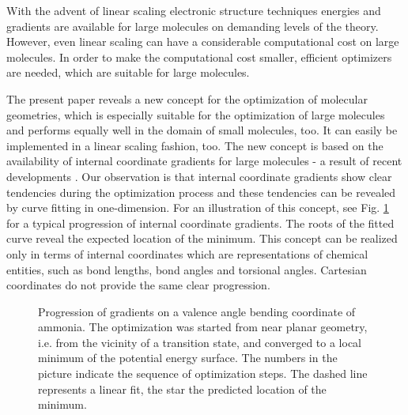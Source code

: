 \documentclass[prl,aps,twocolumn,showpacs,twocolumngrid,superbib]{revtex4}
\begin{document}
With the advent of linear scaling electronic structure techniques 
\cite{Goedecker99}
energies and gradients are available for large molecules on demanding
levels of the theory. However, even linear scaling can have 
a considerable computational cost on large molecules. In order to
make the computational cost smaller, efficient optimizers are
needed, which are suitable for large molecules.

The present paper reveals a new concept for the optimization of
molecular geometries, which is especially suitable for the
optimization of large molecules and performs equally well in the
domain of small molecules, too. It can easily be implemented
in a linear scaling fashion, too.
The new concept is based on the availability of internal coordinate
gradients for large molecules - a result of recent developments
\cite{paizs_coordtrf1,nemeth_coordtrf1,paizs_coordtrf2,nemeth_coordtrf2,billeter_coordtrf,andzelm_coordtrf,kudin_coordtrf}.
Our observation is that internal coordinate gradients show clear
tendencies during the optimization process and these tendencies 
can be revealed
by curve fitting in one-dimension. 
For an illustration of this concept,
see Fig. \ref{NH3outp6} for a typical progression of internal coordinate
gradients. The roots of the fitted curve reveal the expected location
of the minimum. This concept can be realized only in terms of
internal coordinates which are representations of chemical entities, such as
bond lengths, bond angles and torsional angles. Cartesian
coordinates do not provide the same clear progression.
\begin{figure}[h]
\caption{
\small  
Progression of gradients on a valence angle bending coordinate of
ammonia. The optimization was started from near planar geometry, i.e.
from the vicinity of a transition state, and converged to a local 
minimum of the potential energy surface. The numbers in the picture
indicate the sequence of optimization steps. The dashed line represents
a linear fit, the star the predicted location of the minimum.
\label{NH3outp6}
}
\end{figure}
\end{document}
